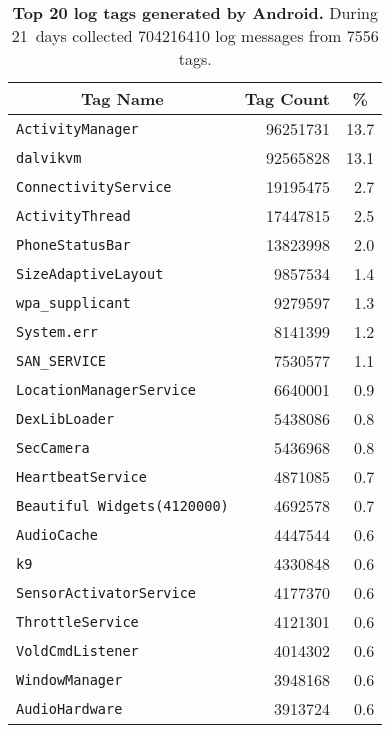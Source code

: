 \begin{table}[t]

\begin{tabularx}{\columnwidth}{Xrr}
\multicolumn{1}{c}{\normalsize{\textbf{Tag Name}}} & 
\multicolumn{1}{c}{\normalsize{\textbf{Tag Count}}} & 
\multicolumn{1}{c}{\normalsize{\textbf{\%}}} \\
\toprule
\texttt{ActivityManager} & \num{96251731} & 13.7 \\
\texttt{dalvikvm} & \num{92565828} & 13.1 \\
\texttt{ConnectivityService} & \num{19195475} & 2.7 \\
\texttt{ActivityThread} & \num{17447815} & 2.5 \\
\texttt{PhoneStatusBar} & \num{13823998} & 2.0 \\
\texttt{SizeAdaptiveLayout} & \num{9857534} & 1.4 \\
\texttt{wpa\_supplicant} & \num{9279597} & 1.3 \\
\texttt{System.err} & \num{8141399} & 1.2 \\
\texttt{SAN\_SERVICE} & \num{7530577} & 1.1 \\
\texttt{LocationManagerService} & \num{6640001} & 0.9 \\
\texttt{DexLibLoader} & \num{5438086} & 0.8 \\
\texttt{SecCamera} & \num{5436968} & 0.8 \\
\texttt{HeartbeatService} & \num{4871085} & 0.7 \\
\texttt{Beautiful Widgets(4120000)} & \num{4692578} & 0.7 \\
\texttt{AudioCache} & \num{4447544} & 0.6 \\
\texttt{k9} & \num{4330848} & 0.6 \\
\texttt{SensorActivatorService} & \num{4177370} & 0.6 \\
\texttt{ThrottleService} & \num{4121301} & 0.6 \\
\texttt{VoldCmdListener} & \num{4014302} & 0.6 \\
\texttt{WindowManager} & \num{3948168} & 0.6 \\
\texttt{AudioHardware} & \num{3913724} & 0.6 \\
\end{tabularx}

\caption{\textbf{Top 20 log tags generated by Android.} During 21~days
\PhoneLab{} collected \num{704216410} log messages from \num{7556} tags.}

\label{table-logtags}

\vspace*{-0.1in}
\end{table}
